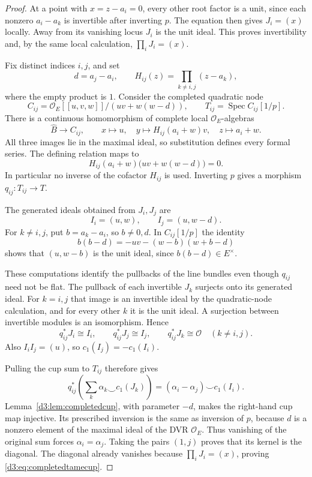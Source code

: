 \documentclass[11pt,a4paper]{amsart}
\numberwithin{equation}{section}
\theoremstyle{definition}
\theoremstyle{remark}
\newcommand{\OO}{\mathcal O}
\newcommand{\Spec}{\operatorname{Spec}}
\begin{document}
\begin{proof}
At a point with $x=z-a_i=0$, every other root factor is a unit, since each nonzero $a_i-a_k$ is invertible after inverting $p$. The equation then gives $J_i=(x)$ locally. Away from its vanishing locus $J_i$ is the unit ideal. This proves invertibility and, by the same local calculation, $\prod_iJ_i=(x)$.

Fix distinct indices $i,j$, and set
\[
d=a_j-a_i,\qquad H_{ij}(z)=\prod_{k\ne i,j}(z-a_k),
\]
where the empty product is $1$. Consider the completed quadratic node
\[
C_{ij}=\OO_E[[u,v,w]]/(uv+w(w-d)),\qquad
T_{ij}=\Spec C_{ij}[1/p].
\]
There is a continuous homomorphism of complete local $\OO_E$-algebras
\begin{equation}\label{d3:eq:pairwiseformalmap}
\widehat B\longrightarrow C_{ij},\qquad
x\longmapsto u,\quad
y\longmapsto H_{ij}(a_i+w)v,\quad
z\longmapsto a_i+w.
\end{equation}
All three images lie in the maximal ideal, so substitution defines every formal series. The defining relation maps to
\[
H_{ij}(a_i+w)\bigl(uv+w(w-d)\bigr)=0.
\]
In particular no inverse of the cofactor $H_{ij}$ is used. Inverting $p$ gives a morphism $q_{ij}:T_{ij}\to T$.

The generated ideals obtained from $J_i,J_j$ are
\[
I_i=(u,w),\qquad I_j=(u,w-d).
\]
For $k\ne i,j$, put $b=a_k-a_i$, so $b\ne0,d$. In $C_{ij}[1/p]$ the identity
\[
b(b-d)=-uv-(w-b)(w+b-d)
\]
shows that $(u,w-b)$ is the unit ideal, since $b(b-d)\in E^\times$.

These computations identify the pullbacks of the line bundles even though $q_{ij}$ need not be flat. The pullback of each invertible $J_k$ surjects onto its generated ideal. For $k=i,j$ that image is an invertible ideal by the quadratic-node calculation, and for every other $k$ it is the unit ideal. A surjection between invertible modules is an isomorphism. Hence
\[
q_{ij}^*J_i\cong I_i,\qquad
q_{ij}^*J_j\cong I_j,\qquad
q_{ij}^*J_k\cong\OO\quad(k\ne i,j).
\]
Also $I_iI_j=(u)$, so $c_1(I_j)=-c_1(I_i)$.

Pulling the cup sum to $T_{ij}$ therefore gives
\[
q_{ij}^*\left(\sum_k\alpha_k\smile c_1(J_k)\right)
=(\alpha_i-\alpha_j)\smile c_1(I_i).
\]
Lemma~\ref{d3:lem:completedcup}, with parameter $-d$, makes the right-hand cup map injective. Its prescribed inversion is the same as inversion of $p$, because $d$ is a nonzero element of the maximal ideal of the DVR $\OO_E$. Thus vanishing of the original sum forces $\alpha_i=\alpha_j$. Taking the pairs $(1,j)$ proves that its kernel is the diagonal. The diagonal already vanishes because $\prod_iJ_i=(x)$, proving \eqref{d3:eq:completedtamecup}.
\end{proof}
\end{document}
